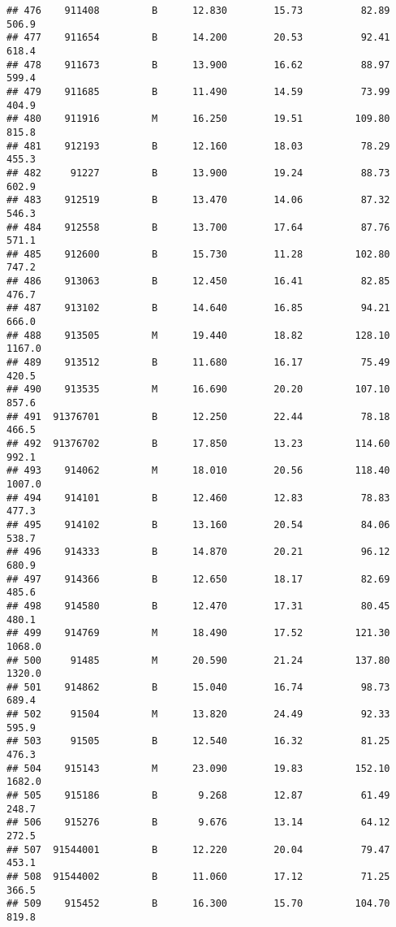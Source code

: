 \documentclass[
]{article}
\begin{document}
\begin{verbatim}
## 476    911408         B      12.830        15.73          82.89     506.9
## 477    911654         B      14.200        20.53          92.41     618.4
## 478    911673         B      13.900        16.62          88.97     599.4
## 479    911685         B      11.490        14.59          73.99     404.9
## 480    911916         M      16.250        19.51         109.80     815.8
## 481    912193         B      12.160        18.03          78.29     455.3
## 482     91227         B      13.900        19.24          88.73     602.9
## 483    912519         B      13.470        14.06          87.32     546.3
## 484    912558         B      13.700        17.64          87.76     571.1
## 485    912600         B      15.730        11.28         102.80     747.2
## 486    913063         B      12.450        16.41          82.85     476.7
## 487    913102         B      14.640        16.85          94.21     666.0
## 488    913505         M      19.440        18.82         128.10    1167.0
## 489    913512         B      11.680        16.17          75.49     420.5
## 490    913535         M      16.690        20.20         107.10     857.6
## 491  91376701         B      12.250        22.44          78.18     466.5
## 492  91376702         B      17.850        13.23         114.60     992.1
## 493    914062         M      18.010        20.56         118.40    1007.0
## 494    914101         B      12.460        12.83          78.83     477.3
## 495    914102         B      13.160        20.54          84.06     538.7
## 496    914333         B      14.870        20.21          96.12     680.9
## 497    914366         B      12.650        18.17          82.69     485.6
## 498    914580         B      12.470        17.31          80.45     480.1
## 499    914769         M      18.490        17.52         121.30    1068.0
## 500     91485         M      20.590        21.24         137.80    1320.0
## 501    914862         B      15.040        16.74          98.73     689.4
## 502     91504         M      13.820        24.49          92.33     595.9
## 503     91505         B      12.540        16.32          81.25     476.3
## 504    915143         M      23.090        19.83         152.10    1682.0
## 505    915186         B       9.268        12.87          61.49     248.7
## 506    915276         B       9.676        13.14          64.12     272.5
## 507  91544001         B      12.220        20.04          79.47     453.1
## 508  91544002         B      11.060        17.12          71.25     366.5
## 509    915452         B      16.300        15.70         104.70     819.8

\end{verbatim}
\end{document}
